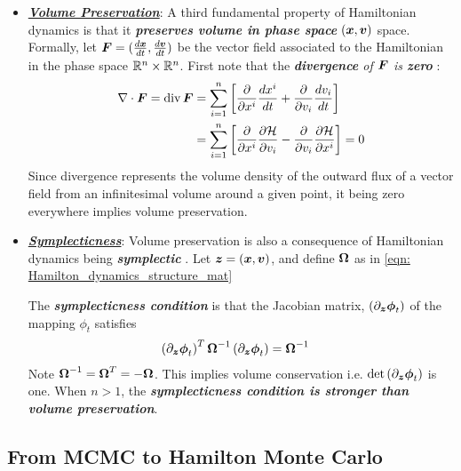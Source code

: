 \documentclass[11pt]{article}
\begin{document}
\begin{itemize}
\begin{itemize}
\item  \underline{\emph{\textbf{Volume Preservation}}}: A third fundamental property of Hamiltonian dynamics is that it \textbf{\emph{preserves volume in phase space}} $(\boldsymbol{x}, \boldsymbol{v})$ space. Formally, let $\boldsymbol{F}= (\frac{d \boldsymbol{x}}{dt}, \frac{d \boldsymbol{v}}{dt})$ be the vector field associated to the Hamiltonian in the phase space ${\mathbb R}^n \times {\mathbb R}^{n}$. First note that the \emph{\textbf{divergence} of $\boldsymbol{F}$ is \textbf{zero}} \citep{brooks2011handbook}:
\begin{align}
\nabla \cdot \boldsymbol{F} = \text{div}\,\boldsymbol{F} &= \sum_{i=1}^{n}\left[\frac{\partial }{ \partial x^{i}}\frac{d x^{i}}{dt} +  \frac{\partial }{ \partial v_{i}}\frac{d v_{i}}{dt}\right] \nonumber\\
&= \sum_{i=1}^{n}\left[\frac{\partial }{ \partial x^{i}}\frac{\partial {\mathcal H}}{ \partial v_{i}}  -  \frac{\partial }{ \partial v_{i}}\frac{\partial {\mathcal H}}{ \partial x^{i}} \right] = 0\label{eqn: Hamiltonian_vol_conserve}
\end{align} Since divergence represents the volume density of the outward flux of a vector field from an infinitesimal volume around a given point, it being zero everywhere implies volume preservation. 

\item \underline{\emph{\textbf{Symplecticness}}}: Volume preservation is also a consequence of Hamiltonian dynamics being \emph{\textbf{symplectic}} \citep{brooks2011handbook}. Let $\boldsymbol{z} = (\boldsymbol{x}, \boldsymbol{v})$, and define $\boldsymbol{\Omega}$ as in \eqref{eqn: Hamilton_dynamics_structure_mat} 

The \emph{\textbf{symplecticness condition}} is that the Jacobian matrix, $\left(\partial_{\boldsymbol{z}}\boldsymbol{\phi}_t\right)$ of the mapping $\phi_t$ satisfies
\begin{align}
\left(\partial_{\boldsymbol{z}}\boldsymbol{\phi}_t\right)^{T}\boldsymbol{\Omega}^{-1}\left(\partial_{\boldsymbol{z}}\boldsymbol{\phi}_t\right) &= \boldsymbol{\Omega}^{-1} \label{eqn: symplecticness}
\end{align} Note $\boldsymbol{\Omega}^{-1} = \boldsymbol{\Omega}^{T} = -\boldsymbol{\Omega}$. This implies volume conservation i.e. $\det{\left(\partial_{\boldsymbol{z}}\boldsymbol{\phi}_t\right)}$ is one. When $n > 1$, the \emph{\textbf{symplecticness condition is stronger than volume preservation}}. 

\end{itemize}

\end{itemize}

\subsection{From MCMC to Hamilton Monte Carlo}
\end{document}
